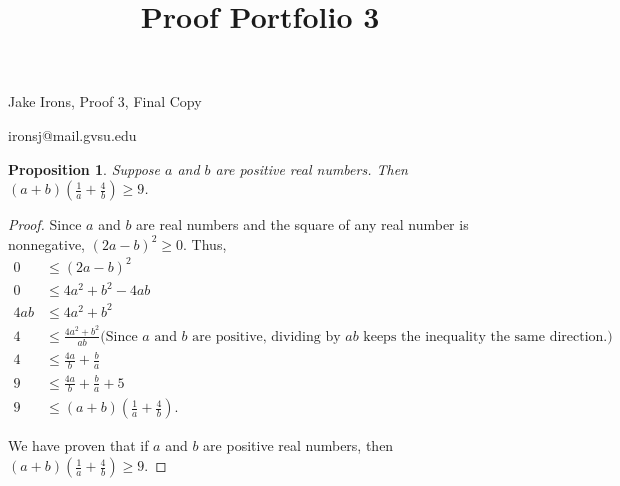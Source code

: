 \documentclass[11 pt]{article}
\title{Proof Portfolio 3}
\newtheorem{proposition}{Proposition}
\newcommand{\newpar}{\vspace{.15in}\noindent}
\begin{document}
\noindent Jake Irons, Proof 3, Final Copy

\noindent ironsj@mail.gvsu.edu
\newpar
\begin{proposition}
Suppose $a$ and $b$ are positive real numbers. Then $(a+b)(\frac{1}{a}+\frac{4}{b}) \ge9$.
\end{proposition}
\begin{proof}
Since $a$ and $b$ are real numbers and the square of any real number is nonnegative, $(2a-b)^2\ge0$. Thus,
\begin{align*}
0&\le(2a-b)^2 \\
0&\le4a^2+b^2-4ab \\
4ab&\le4a^2+b^2 \\
4&\le\frac{4a^2+b^2}{ab} \mbox{(Since $a$ and $b$ are positive, dividing by $ab$ keeps the inequality the same direction.)} \\
4&\le\frac{4a}{b}+\frac{b}{a} \\
9&\le\frac{4a}{b}+\frac{b}{a}+5 \\
9&\le(a+b)(\frac{1}{a}+\frac{4}{b}).
\end{align*}

\noindent
We have proven that if $a$ and $b$ are positive real numbers, then $(a+b)(\frac{1}{a}+\frac{4}{b})\ge9$.
\end{proof}
\end{document}
